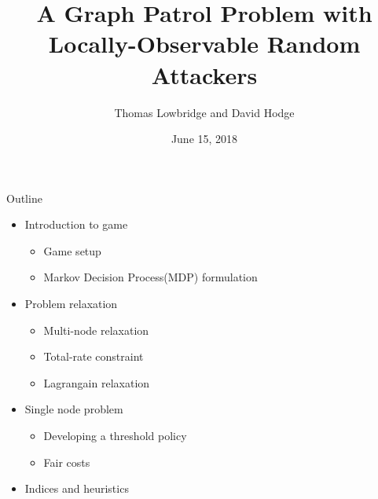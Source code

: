 \documentclass[10pt]{beamer}
\author{Thomas Lowbridge and David Hodge}
\title{A Graph Patrol Problem with Locally-Observable Random Attackers}
\institute{University Of Nottingham,UK}
\date{June 15, 2018}
\begin{document}
\hypertarget{Patrolling games}{}
\begin{frame}
\titlepage
\end{frame}


\begin{frame}{Outline}

\begin{itemize}
\item Introduction to game
\begin{itemize}
\item Game setup
\item Markov Decision Process(MDP) formulation
\end{itemize}
\item Problem relaxation
\begin{itemize}
\item Multi-node relaxation
\item Total-rate constraint
\item Lagrangain relaxation
\end{itemize}
\item Single node problem
\begin{itemize}
\item Developing a threshold policy
\item Fair costs
\end{itemize}
\item Indices and heuristics
\end{itemize}
\end{frame}
\end{document}
